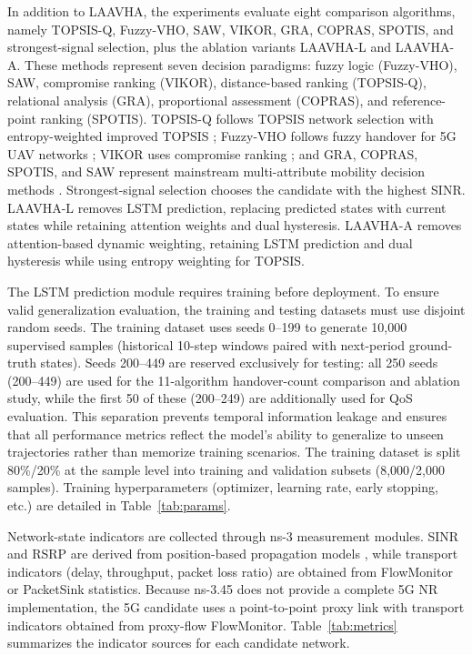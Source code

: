 \documentclass[preprint,12pt]{elsarticle}
\begin{document}
In addition to LAAVHA, the experiments evaluate eight comparison algorithms, namely TOPSIS-Q, Fuzzy-VHO, SAW, VIKOR, GRA, COPRAS, SPOTIS, and strongest-signal selection, plus the ablation variants LAAVHA-L and LAAVHA-A. These methods represent seven decision paradigms: fuzzy logic (Fuzzy-VHO), SAW, compromise ranking (VIKOR), distance-based ranking (TOPSIS-Q), relational analysis (GRA), proportional assessment (COPRAS), and reference-point ranking (SPOTIS). TOPSIS-Q follows TOPSIS network selection with entropy-weighted improved TOPSIS \cite{ref8,ref9,ref10}; Fuzzy-VHO follows fuzzy handover for 5G UAV networks \cite{ref4}; VIKOR uses compromise ranking \cite{ref11}; and GRA, COPRAS, SPOTIS, and SAW represent mainstream multi-attribute mobility decision methods \cite{ref12}. Strongest-signal selection chooses the candidate with the highest SINR. LAAVHA-L removes LSTM prediction, replacing predicted states with current states while retaining attention weights and dual hysteresis. LAAVHA-A removes attention-based dynamic weighting, retaining LSTM prediction and dual hysteresis while using entropy weighting for TOPSIS.

The LSTM prediction module requires training before deployment. To ensure valid generalization evaluation, the training and testing datasets must use disjoint random seeds. The training dataset uses seeds 0--199 to generate 10,000 supervised samples (historical 10-step windows paired with next-period ground-truth states). Seeds 200--449 are reserved exclusively for testing: all 250 seeds (200--449) are used for the 11-algorithm handover-count comparison and ablation study, while the first 50 of these (200--249) are additionally used for QoS evaluation. This separation prevents temporal information leakage and ensures that all performance metrics reflect the model's ability to generalize to unseen trajectories rather than memorize training scenarios. The training dataset is split 80\%/20\% at the sample level into training and validation subsets (8,000/2,000 samples). Training hyperparameters (optimizer, learning rate, early stopping, etc.) are detailed in Table~\ref{tab:params}.

Network-state indicators are collected through ns-3 measurement modules. SINR and RSRP are derived from position-based propagation models \cite{ref33}, while transport indicators (delay, throughput, packet loss ratio) are obtained from FlowMonitor or PacketSink statistics. Because ns-3.45 does not provide a complete 5G NR implementation, the 5G candidate uses a point-to-point proxy link with transport indicators obtained from proxy-flow FlowMonitor. Table~\ref{tab:metrics} summarizes the indicator sources for each candidate network.
\end{document}
